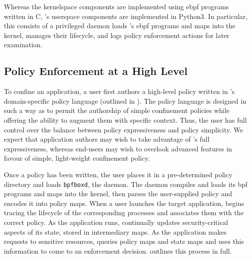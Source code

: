 Whereas the kernelspace components are implemented using \gls{ebpf} programs written in C,
\bpfbox{}'s userspace components are implemented in Python3. In particular, this consists
of a privileged daemon loads \bpfbox{}'s \gls{ebpf} programs and maps into the kernel,
manages their lifecycle, and logs policy enforcement actions for later examination.


\subsection{Policy Enforcement at a High Level}%
\label{ss:bpfbox-enforcement-overview}

To confine an application, a user first authors a high-level policy written in \bpfbox{}'s
domain-specific policy language (outlined in ). The policy
language is designed in such a way as to permit the authorship of simple confinement
policies while offering the ability to augment them with specific context. Thus, the user
has full control over the balance between policy expressiveness and policy simplicity. We
expect that application authors may wish to take advantage of \bpfbox{}'s full
expressiveness, whereas end-users may wish to overlook advanced features in favour of
simple, light-weight confinement policy.

Once a policy has been written, the user places it in a pre-determined policy directory
and loads \texttt{bpfboxd}, the \bpfbox{} daemon. The daemon compiles and loads its
\gls{bpf} programs and maps into the kernel, then parses the user-supplied policy and
encodes it into policy maps. When a user launches the target application, \bpfbox{} begins
tracing the lifecycle of the corresponding processes and associates them with the correct
policy. As the application runs, \bpfbox{} continually updates security-critical aspects
of its state, stored in intermediary maps. As the application makes requests to sensitive
resources, \bpfbox{} queries policy maps and state maps and uses this information to come
to an enforcement decision.  outlines this process in full.

